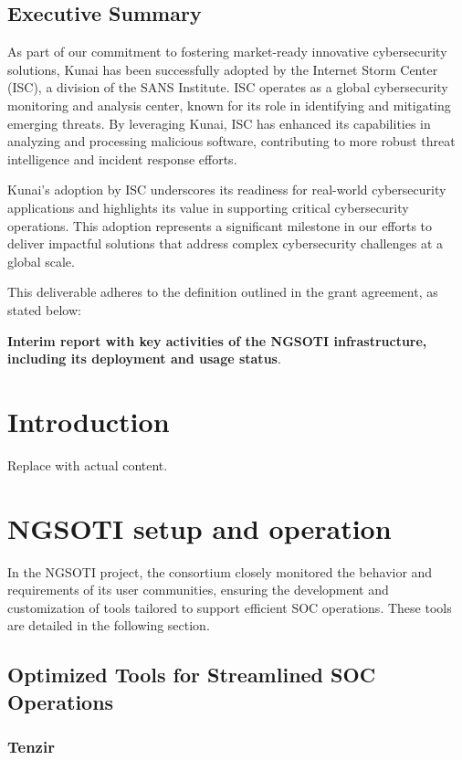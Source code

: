 \section*{Executive Summary}

As part of our commitment to fostering market-ready innovative cybersecurity solutions, Kunai has been successfully adopted by the Internet Storm Center (ISC), a division of the SANS Institute. ISC operates as a global cybersecurity monitoring and analysis center, known for its role in identifying and mitigating emerging threats. By leveraging Kunai, ISC has enhanced its capabilities in analyzing and processing malicious software, contributing to more robust threat intelligence and incident response efforts.

Kunai's adoption by ISC underscores its readiness for real-world cybersecurity applications and highlights its value in supporting critical cybersecurity operations. This adoption represents a significant milestone in our efforts to deliver impactful solutions that address complex cybersecurity challenges at a global scale.


This deliverable adheres to the definition outlined in the grant agreement, as stated below:

\textbf{ Interim report with key activities of the NGSOTI infrastructure, including its deployment and usage status}.


\chapter{Introduction}
Replace with actual content.

\chapter{NGSOTI setup and operation}
In the NGSOTI project, the consortium closely monitored the behavior and requirements of its user communities, ensuring the development and customization of tools tailored to support efficient SOC operations. These tools are detailed in the following section.

\section{Optimized Tools for Streamlined SOC Operations}


\subsection{Tenzir}


